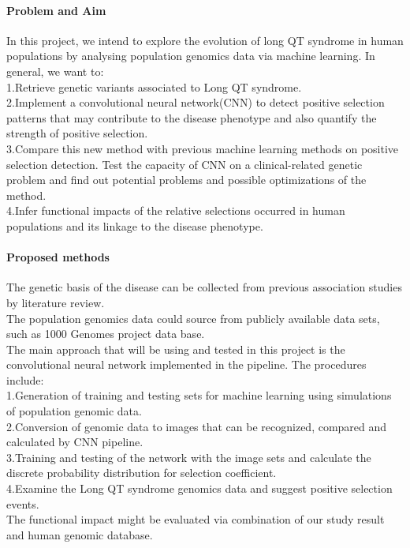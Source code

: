 \documentclass[11pt,a4paper]{article}
\begin{document}
\paragraph{Problem and Aim}
In this project, we intend to explore the evolution of long QT syndrome in human populations by analysing population genomics data via machine learning.
In general, we want to:
\\
1.Retrieve genetic variants associated to Long QT syndrome.
\\
2.Implement a convolutional neural network(CNN) to detect positive selection patterns that may contribute to the disease phenotype and also quantify the strength of positive selection.
\\
3.Compare this new method with previous machine learning methods on positive selection detection. Test the capacity of CNN on a clinical-related genetic problem and find out potential problems and possible optimizations of the method.
\\
4.Infer functional impacts of the relative selections occurred in human populations and its linkage to the disease phenotype.

\paragraph{Proposed methods}
The genetic basis of the disease can be collected from previous association studies by literature review.
\\
The population genomics data could source from publicly available data sets, such as 1000 Genomes project data base.
\\
The main approach that will be using and tested in this project is the convolutional neural network implemented in the pipeline. The procedures include:
\\
1.Generation of training and testing sets for machine learning using simulations of population genomic data.
\\
2.Conversion of genomic data to images that can be recognized, compared and calculated by CNN pipeline.
\\
3.Training and testing of the network with the image sets and calculate the discrete probability distribution for selection coefficient.
\\
4.Examine the Long QT syndrome genomics data and suggest positive selection events.
\\
The functional impact might be evaluated via combination of our study result and human genomic database. 
\end{document}
